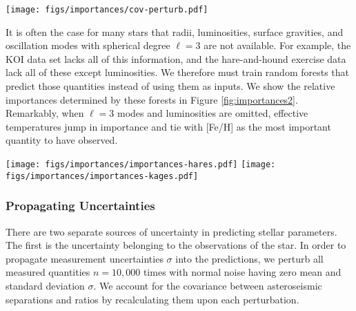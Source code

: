 \documentclass[manuscript]{aastex}
\begin{document}
\begin{figure*}
    \centering
    \texttt{[image: figs/importances/cov-perturb.pdf]}
    \caption{Standardized covariances of random forest feature importances, with the variables shown in order of median importance. Blue points on the off-diagonal indicate that when the abscissa variable is selected, the ordinate variable is redundant; and conversely, red points indicate that when the abscissa variable is selected, the ordinate variable becomes more useful for successful forecasting.}
    \label{fig:importance-covariances}
\end{figure*}

It is often the case for many stars that radii, luminosities, surface gravities, and oscillation modes with spherical degree $\ell=3$ are not available. For example, the KOI data set lacks all of this information, and the hare-and-hound exercise data lack all of these except luminosities. We therefore must train random forests that predict those quantities instead of using them as inputs. We show the relative importances determined by these forests in Figure \ref{fig:importances2}. Remarkably, when $\ell=3$ modes and luminosities are omitted, effective temperatures jump in importance and tie with [Fe/H] as the most important quantity to have observed. 

\begin{figure*}
    \centering
    \texttt{[image: figs/importances/importances-hares.pdf]}\hfill
    \texttt{[image: figs/importances/importances-kages.pdf]}
    \caption{Box-and-whisker plots of relative importances of each observable feature in measuring fundamental stellar parameters for the hare-and-hound exercise data (left), where luminosities are available; and the Kepler objects-of-interest (right), where they are not. Octupole ($\ell=3$) modes have not been measured in any of these stars, so $\langle\delta\nu_{1,3}\rangle$ and $\langle r_{1,3}\rangle$ from evolutionary modelling are not supplied to these random forests. }
    \label{fig:importances2}
\end{figure*}


\subsubsection{Propagating Uncertainties}
\label{sec:uncertainties}
There are two separate sources of uncertainty in predicting stellar parameters. The first is the uncertainty belonging to the observations of the star. In order to propagate measurement uncertainties $\sigma$ into the predictions, we perturb all measured quantities $n=10,000$ times with normal noise having zero mean and standard deviation $\sigma$. We account for the covariance between asteroseismic separations and ratios by recalculating them upon each perturbation. 
\end{document}
